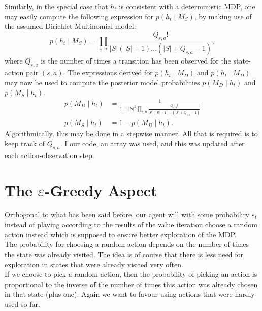 \documentclass{scrartcl}
\begin{document}
Similarly, in the special case that $h_t$ is consistent with a deterministic MDP, one may easily compute the following expression for $p(h_t \mid M_S)$, by making use of the assumed Dirichlet-Multinomial model:
\begin{equation*}
p(h_t \mid M_S) = \prod_{s, a} \frac{Q_{s, a} !}{|S| (|S| + 1) \dots (|S| + Q_{s, a} - 1)} ,
\end{equation*}
where $Q_{s, a}$ is the number of times a transition has been observed for the state-action pair $(s, a)$. The expressions derived for $p(h_t \mid M_D)$ and $p(h_t \mid M_D)$ may now be used to compute the posterior model probabilities $p(M_D \mid h_t )$ and $p(M_S \mid h_t )$. 
\begin{align*}
p(M_D \mid h_t ) & = \frac{1}{1 + |S|^k \prod_{s, a} \frac{Q_{s, a} !}{|S| (|S| + 1) \dots (|S| + Q_{s, a} - 1)} } \\
p(M_S \mid h_t ) & = 1 - p(M_D \mid h_t) .
\end{align*}
Algorithmically, this may be done in a stepwise manner. All that is required is to keep track of $Q_{s,a}$. I our code, an array was used, and this was updated after each action-observation step.

\section{The $ε$-Greedy Aspect}

Orthogonal to what has been said before, our agent will with some probability $ε_t$ instead of playing according to the results of the value iteration choose a random action instead which is supposed to ensure better exploration of the MDP.\\

The probability for choosing a random action depends on the number of times the state was already visited. The idea is of course that there is less need for exploration in states that were already visited very often.\\

If we choose to pick a random action, then the probability of picking an action is proportional to the inverse of the number of times this action was already chosen in that state (plus one). Again we want to favour using actions that were hardly used so far.
\end{document}
